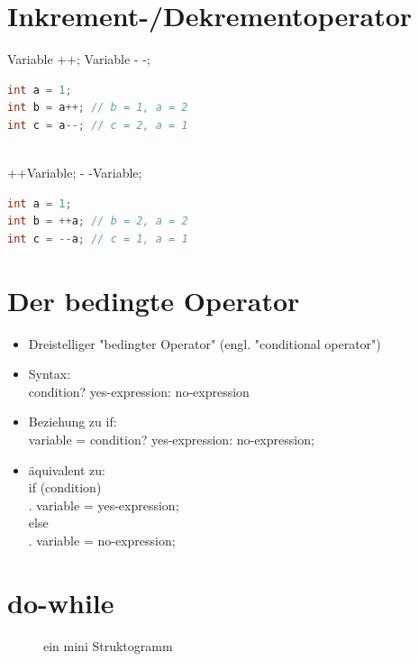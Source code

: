  \section{Inkrement-/Dekrementoperator}
Variable ++; \qquad Variable - -;
 \begin{lstlisting}[language=JAVA]
 int a = 1;
int b = a++; // b = 1, a = 2
int c = a--; // c = 2, a = 1
 \end{lstlisting}
 \qquad\\
++Variable; \qquad - -Variable;
 \begin{lstlisting}[language=JAVA]
int a = 1;
int b = ++a; // b = 2, a = 2
int c = --a; // c = 1, a = 1
 \end{lstlisting}
 \section{Der bedingte Operator}
 \begin{itemize}
 \item Dreistelliger "bedingter Operator" (engl. "conditional operator")
	\item Syntax: \\
		 condition? yes-expression: no-expression
	\item Beziehung zu if:\\
		 variable = condition? yes-expression: no-expression;
	\item äquivalent zu:\\
		 if (condition)\\
		. \qquad variable = yes-expression;\\
		 else\\
		. \qquad variable = no-expression;\\
\end{itemize}
%
%
%
\section{do-while}

\begin{figure} [H]
	\centering 
	\caption{ein mini Struktogramm} 
\end{figure}

